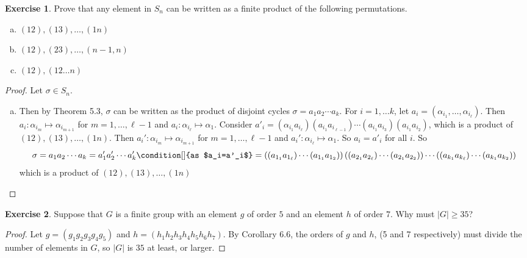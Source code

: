 \documentclass{article}
\theoremstyle{definition}
\newtheorem{theorem}{Exercise}[section]
\theoremstyle{remark}
\begin{document}
	\setcounter{theorem}{25}
	\begin{theorem}
		Prove that any element in $S_n$ can be written as a finite product of the following permutations.
		\begin{multicols}{3}
		\begin{enumerate}[(a)]%
			\item $(12),(13),\ldots,(1n)$
			\item $(12),(23),\ldots,\left(n-1,n\right)$
			\item $(12),(12\ldots n)$
		\end{enumerate}
		\end{multicols}
	\end{theorem}
	\begin{proof} Let $\sigma\in S_n$. 
		\begin{enumerate} [(a)]
			\item Then by Theorem 5.3, $\sigma$ can be written as the product of disjoint cycles $\sigma=a_1a_2\cdots a_k$. For $i=1,\ldots k$, let $a_i=\left(\alpha_{i_1},\ldots,\alpha_{i_\ell}\right)$. Then $a_i:\alpha_{i_m}\mapsto\alpha_{i_{m+1}}$ for $m=1,\ldots,\ell-1$ and $a_i:\alpha_{i_\ell}\mapsto\alpha_1$. Consider $a'_i=(\alpha_{i_1}a_{i_\ell})(a_{i_1}a_{i_{\ell-1}})\cdots(a_{i_1}a_{i_3})(a_{i_1}a_{i_2})$, which is a product of $(12),(13),\ldots,(1n)$. Then $a_i':\alpha_{i_m}\mapsto\alpha_{i_{m+1}}$ for $m=1,\ldots,\ell-1$ and $a_i':\alpha_{i_\ell}\mapsto\alpha_1$. So $a_i=a'_i$ for all $i$. So 
			\begin{dmath*}
				\sigma = a_1a_2\cdots a_k = a_1'a_2'\cdots a_k' \condition[]{as $a_i=a'_i$} = \left((a_{1_1}a_{1_\ell})\cdots(a_{1_1}a_{1_2})\right)\left((a_{2_1}a_{2_\ell})\cdots(a_{2_1}a_{2_2})\right)\cdots \left((a_{k_1}a_{k_\ell})\cdots(a_{k_1}a_{k_2})\right)
			\end{dmath*}which is a product of $(12),(13),\ldots,(1n)$\qedhere
		\end{enumerate}
	\end{proof}
	
	
	\setcounter{section}{6}
	\setcounter{theorem}{0}
	\begin{theorem}
		Suppose that $G$ is a finite group with an element $g$ of order $5$ and an element $h$ of order $7$. Why must $|G|\geq35$?
	\end{theorem}
	\begin{proof}
		Let $g=(g_1g_2g_3g_4g_5)$ and $h=(h_1h_2h_3h_4h_5h_6h_7)$. By Corollary 6.6, the orders of $g$ and $h$, (5 and 7 respectively) must divide the number of elements in $G$, so $|G|$ is $35$ at least, or larger. 
	\end{proof}
	
\end{document}
